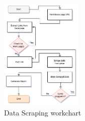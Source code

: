 \begin{figure}[htbp]
    \centering
    \includegraphics[width=0.35\textwidth]{images/workchartscraper.png}
    \caption{Data Scraping workchart}
    \label{fig:scraping-workchart}
\end{figure}

\newpage


